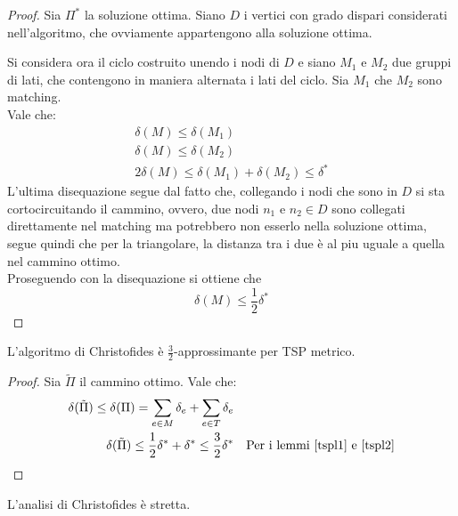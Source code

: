 \begin{proof}
    Sia $\Pi^*$ la soluzione ottima.
    Siano $D$ i vertici con grado dispari considerati nell'algoritmo, che ovviamente appartengono alla soluzione
    ottima.

    Si considera ora il ciclo costruito unendo i nodi di $D$ e siano $M_1$ e $M_2$ due gruppi di lati, 
    che contengono in maniera alternata i lati del ciclo.
    Sia $M_1$ che $M_2$ sono matching.\\
    Vale che:
    \begin{equation}
        \begin{aligned}
            \delta(M) \leq \delta(M_1)\\
            \delta(M) \leq \delta(M_2)\\
            2\delta(M) \leq \delta(M_1) + \delta(M_2) \leq \delta^*
        \end{aligned}
    \end{equation}
    L'ultima disequazione segue dal fatto che, collegando i nodi che sono in $D$ si sta cortocircuitando il cammino, 
    ovvero, due nodi $n_1$ e $n_2 \in D$ sono collegati direttamente nel matching ma potrebbero non esserlo 
    nella soluzione ottima, segue quindi che per la triangolare, la distanza tra i due è al piu uguale a quella nel cammino 
    ottimo.\\
    Proseguendo con la disequazione si ottiene che
    $$\delta(M) \leq \frac{1}{2}\delta^*$$
\end{proof}
\begin{theorem}
    L'algoritmo di Christofides è $\frac{3}{2}$-approssimante per TSP metrico.
\end{theorem}
\begin{proof}
    Sia $\tilde{\Pi}$ il cammino ottimo.
    Vale che:
    \begin{equation}
        \begin{aligned}
            \delta(\tilde{\Pi}) \leq \delta(\Pi) = \sum_{e \in M}\delta_e + \sum_{e \in T}\delta_e\\
            \delta(\tilde{\Pi}) \leq \frac{1}{2}\delta^* + \delta^* \leq \frac{3}{2}\delta^* && \text{Per i lemmi \ref{tspl1} e \ref{tspl2}}\\
        \end{aligned}
    \end{equation}
\end{proof}
\begin{theorem}
    L'analisi di Christofides è stretta.
\end{theorem}
